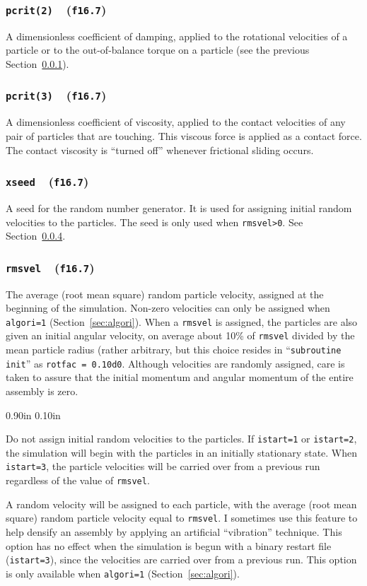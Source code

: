 \documentclass[letterpaper,11pt]{article}
\newcommand{\Var}[2]{\texttt{#1}\ \  (\texttt{#2})}
\newlength{\Labelwidth}
\newcommand{\Entrylabel}[1]{\makebox[\Labelwidth][r]{\texttt{#1}}}
\newenvironment{Options}
{\begin{list}{}{%
\renewcommand{\makelabel}{\Entrylabel}%
\setlength{\leftmargin} {0.90in}%
\setlength{\rightmargin}{0.00in}%
\setlength{\labelsep}   {0.10in}%
\setlength{\labelwidth} {\Labelwidth}%
}}
{\end{list}}
\begin{document}
\subsubsection[\texttt{pcrit(2)}]{\Var{pcrit(2)}{f16.7}}\label{sec:pcrit2}
A dimensionless coefficient of damping, applied to the rotational
velocities of a particle or to
the out-of-balance torque on a particle
(see the previous Section~\ref{sec:pcrit2}).
%
\subsubsection[\texttt{pcrit(3)}]{\Var{pcrit(3)}{f16.7}}\label{sec:pcrit3}
A dimensionless coefficient of viscosity, applied to the 
contact velocities of any pair of particles
that are touching.  This viscous force is
applied as a contact force.
The contact viscosity is ``turned off'' whenever frictional sliding occurs.
\subsubsection[\texttt{xseed}]{\Var{xseed}{f16.7}}\label{sec:xseed}
A seed for the random number generator. 
It is used for assigning
initial random velocities to the particles.
The seed is only used when \mbox{\texttt{rmsvel>0}}.
See Section~\ref{sec:rmsvel}.
%
\subsubsection[\texttt{rmsvel}]{\Var{rmsvel}{f16.7}}\label{sec:rmsvel}
The average (root mean square) random particle velocity, assigned
at the beginning of the simulation.  
Non-zero velocities can only be assigned when \texttt{algori=1}
(Section~\ref{sec:algori}).
When a \texttt{rmsvel} is assigned, the particles are also given
an initial angular velocity, on average about 10\% of \texttt{rmsvel}
divided by the mean particle radius (rather arbitrary, but this
choice resides in ``\texttt{subroutine init}'' as 
\texttt{rotfac = 0.10d0}.
Although velocities are randomly assigned, care is taken to
assure that the initial momentum and angular momentum of the entire
assembly is zero.
\begin{Options}
\item[rmsvel=0.]
Do not assign initial random velocities to the particles.
If \texttt{istart=1} or \texttt{istart=2}, the simulation will
begin with the particles in an initially stationary state.
When \texttt{istart=3}, the particle velocities will be carried over
from a previous run regardless of the
value of \texttt{rmsvel}.
\item[rmsvel>0.]
A random velocity will be assigned to each particle,
with the average (root mean square) random particle velocity
equal to \texttt{rmsvel}.
I sometimes use this feature to help densify an assembly by applying an
artificial ``vibration'' technique.
This option has no effect when the simulation is begun with a binary
restart file (\texttt{istart=3}), since the velocities are carried over
from a previous run.
This option is only available when \texttt{algori=1}
(Section~\ref{sec:algori}).
\end{Options}
%
\end{document}
